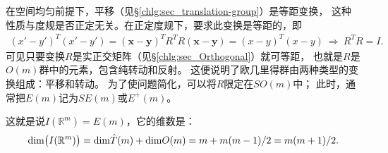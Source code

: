 在空间均匀前提下，平移（见\S\ref{chlg:sec_translation-group}）是等距变换，
这种性质与度规是否正定无关。在正定度规下，要求此变换是等距的，即
\begin{align*}
    (x'-y')^T (x'-y') = ( \boldsymbol{x} - \boldsymbol{y} )^T R^T  R ( \boldsymbol{x} - \boldsymbol{y} )
    = (x-y)^T (x-y) \ \Rightarrow\ R^T R = I .
\end{align*}
可见只要变换$R$是实正交矩阵（见\S\ref{chlg:sec_Orthogonal}）就可等距，
也就是$R$是$O(m)$群中的元素，包含纯转动和反射。
这便说明了欧几里得群由两种类型的变换组成：平移和转动。
为了使问题简化，可以将$R$限定在$SO(m)$中；
此时，通常把$E(m)$记为$SE(m)$或$E^+ (m)$。

这就是说$I(\mathbb{R}^m)=E(m)$，它的维数是：
\begin{equation*}
    {\rm dim}\bigl(I(\mathbb{R}^m)\bigr)= {\rm dim}  \hat{T}(m) + {\rm dim} O(m)
    = m + m(m-1)/2 = m(m+1)/2 .
\end{equation*}



